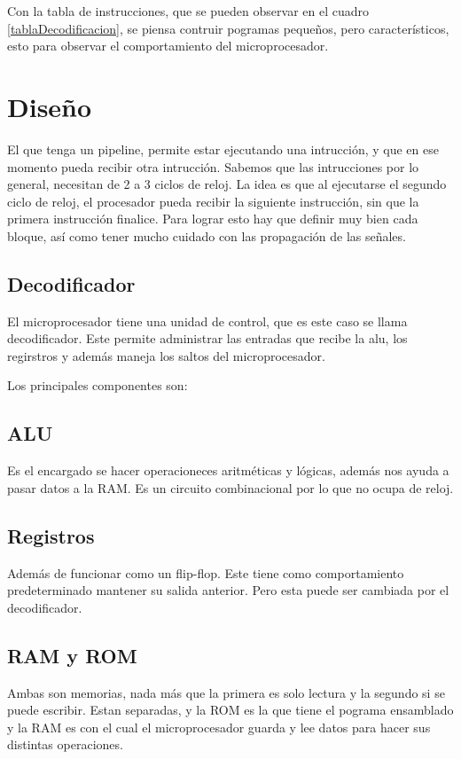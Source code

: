 \documentclass[paper=letter, fontsize=12pt]{article}
\begin{document}
Con la tabla de instrucciones, que se pueden observar en el cuadro \ref{tablaDecodificacion}, se piensa contruir pogramas pequeños, pero característicos, esto para observar el comportamiento del microprocesador.

\section{Diseño}

El que tenga un pipeline, permite estar ejecutando una intrucción, y que en ese momento pueda recibir otra intrucción. Sabemos que las intrucciones por lo general, necesitan de 2 a 3 ciclos de reloj. La idea es que al ejecutarse el segundo ciclo de reloj, el procesador pueda recibir la siguiente instrucción, sin que la primera instrucción finalice. Para lograr esto hay que definir muy bien cada bloque, así como tener mucho cuidado con las propagación de las señales.

\subsection{Decodificador}
El microprocesador tiene una unidad de control, que es este caso se llama decodificador. Este permite administrar las entradas que recibe la alu, los regirstros y además maneja los saltos del microprocesador.

Los principales componentes son:

\subsection{ALU}
Es el encargado se hacer operacioneces aritméticas y lógicas, además nos ayuda a pasar datos a la RAM. Es un circuito combinacional por lo que no ocupa de reloj.

\subsection{Registros}
Además de funcionar como un flip-flop. Este tiene como comportamiento predeterminado mantener su salida anterior. Pero esta puede ser cambiada por el decodificador.

\subsection{RAM y ROM}
Ambas son memorias, nada más que la primera es solo lectura y la segundo si se puede escribir. Estan separadas, y la ROM es la que tiene el pograma ensamblado y la RAM es con el cual el microprocesador guarda y lee datos para hacer sus distintas operaciones.
\end{document}
